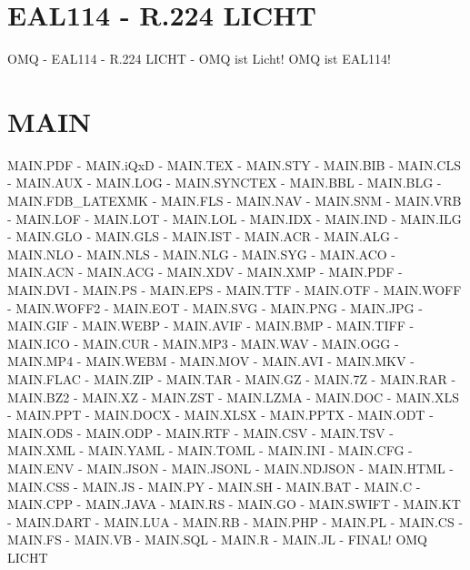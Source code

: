 \documentclass{MAIN}
\begin{document}
\maketitle
\section*{EAL114 - R.224 LICHT}
OMQ - EAL114 - R.224 LICHT - OMQ ist Licht! OMQ ist EAL114!
\section*{MAIN}
MAIN.PDF - MAIN.iQxD - MAIN.TEX - MAIN.STY - MAIN.BIB - MAIN.CLS - MAIN.AUX - MAIN.LOG - MAIN.SYNCTEX - MAIN.BBL - MAIN.BLG - MAIN.FDB_LATEXMK - MAIN.FLS - MAIN.NAV - MAIN.SNM - MAIN.VRB - MAIN.LOF - MAIN.LOT - MAIN.LOL - MAIN.IDX - MAIN.IND - MAIN.ILG - MAIN.GLO - MAIN.GLS - MAIN.IST - MAIN.ACR - MAIN.ALG - MAIN.NLO - MAIN.NLS - MAIN.NLG - MAIN.SYG - MAIN.ACO - MAIN.ACN - MAIN.ACG - MAIN.XDV - MAIN.XMP - MAIN.PDF - MAIN.DVI - MAIN.PS - MAIN.EPS - MAIN.TTF - MAIN.OTF - MAIN.WOFF - MAIN.WOFF2 - MAIN.EOT - MAIN.SVG - MAIN.PNG - MAIN.JPG - MAIN.GIF - MAIN.WEBP - MAIN.AVIF - MAIN.BMP - MAIN.TIFF - MAIN.ICO - MAIN.CUR - MAIN.MP3 - MAIN.WAV - MAIN.OGG - MAIN.MP4 - MAIN.WEBM - MAIN.MOV - MAIN.AVI - MAIN.MKV - MAIN.FLAC - MAIN.ZIP - MAIN.TAR - MAIN.GZ - MAIN.7Z - MAIN.RAR - MAIN.BZ2 - MAIN.XZ - MAIN.ZST - MAIN.LZMA - MAIN.DOC - MAIN.XLS - MAIN.PPT - MAIN.DOCX - MAIN.XLSX - MAIN.PPTX - MAIN.ODT - MAIN.ODS - MAIN.ODP - MAIN.RTF - MAIN.CSV - MAIN.TSV - MAIN.XML - MAIN.YAML - MAIN.TOML - MAIN.INI - MAIN.CFG - MAIN.ENV - MAIN.JSON - MAIN.JSONL - MAIN.NDJSON - MAIN.HTML - MAIN.CSS - MAIN.JS - MAIN.PY - MAIN.SH - MAIN.BAT - MAIN.C - MAIN.CPP - MAIN.JAVA - MAIN.RS - MAIN.GO - MAIN.SWIFT - MAIN.KT - MAIN.DART - MAIN.LUA - MAIN.RB - MAIN.PHP - MAIN.PL - MAIN.CS - MAIN.FS - MAIN.VB - MAIN.SQL - MAIN.R - MAIN.JL - FINAL!
\cite{omq_eal114}
\ac{OMQ}
\ac{LICHT}

\printindex
\printglossary
\printnomenclature
\printacronyms
\end{document}
